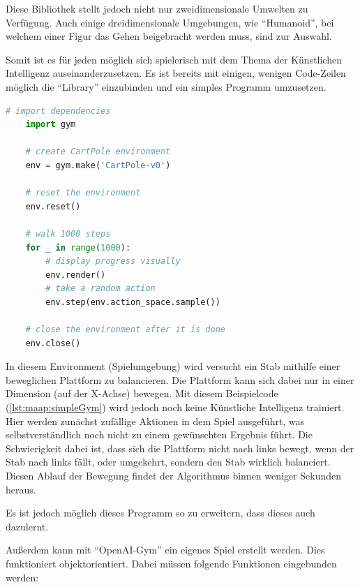 Diese Bibliothek stellt jedoch nicht nur zweidimensionale Umwelten zu Verfügung. Auch einige dreidimensionale Umgebungen, wie ``Humanoid'', bei welchem einer Figur das Gehen beigebracht werden muss, sind zur Auswahl.

Somit ist es für jeden möglich sich spielerisch mit dem Thema der Künstlichen Intelligenz auseinanderzusetzen. Es ist bereits mit einigen, wenigen Code-Zeilen möglich die ``Library'' einzubinden und ein simples Programm umzusetzen.
\begin{lstlisting}[language=Python,label=lst:maap:simpleGym,caption=Simples OpenAI-Gym Programm]
    # import dependencies
    import gym 

    # create CartPole environment
    env = gym.make('CartPole-v0') 

    # reset the environment
    env.reset() 

    # walk 1000 steps
    for _ in range(1000): 
        # display progress visually
        env.render() 
        # take a random action
        env.step(env.action_space.sample()) 
        
    # close the environment after it is done
    env.close()
\end{lstlisting}


In diesem Environment (Spielumgebung) wird versucht ein Stab mithilfe einer beweglichen Plattform zu balancieren. Die Plattform kann sich dabei nur in einer Dimension (auf der X-Achse) bewegen. Mit diesem Beispielcode (\ref{lst:maap:simpleGym}) wird jedoch noch keine Künstliche Intelligenz trainiert. Hier werden zunächst zufällige Aktionen in dem Spiel ausgeführt, was selbstverständlich noch nicht zu einem gewünschten Ergebnis führt. Die Schwierigkeit dabei ist, dass sich die Plattform nicht nach links bewegt, wenn der Stab nach links fällt, oder umgekehrt, sondern den Stab wirklich balanciert. Diesen Ablauf der Bewegung findet der Algorithmus binnen weniger Sekunden heraus.

Es ist jedoch möglich dieses Programm so zu erweitern, dass dieses auch dazulernt.

Außerdem kann mit ``OpenAI-Gym'' ein eigenes Spiel erstellt werden. Dies funktioniert objektorientiert. Dabei müssen folgende Funktionen eingebunden werden:


